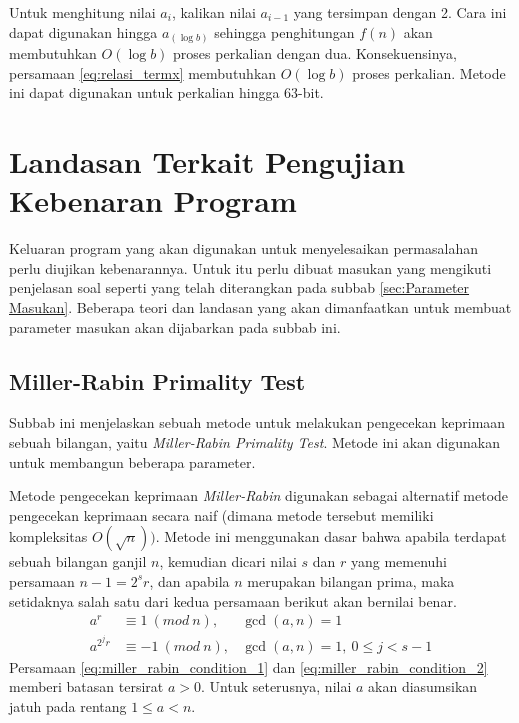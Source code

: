 Untuk menghitung nilai $ a_i $, kalikan nilai $ a_{i-1} $ yang tersimpan dengan 2. Cara ini dapat digunakan hingga $ a_{(\log b)} $ sehingga penghitungan $ f(n) $ akan membutuhkan $ O(\log b) $ proses perkalian dengan dua. Konsekuensinya, persamaan \eqref{eq:relasi_termx} membutuhkan $ O(\allowbreak\log b) $ proses perkalian. Metode ini dapat digunakan untuk perkalian hingga 63-bit.

\section{Landasan Terkait Pengujian Kebenaran Program}
Keluaran program yang akan digunakan untuk menyelesaikan permasalahan perlu diujikan kebenarannya. Untuk itu perlu dibuat masukan yang mengikuti penjelasan soal seperti yang telah diterangkan pada subbab \ref{sec:Parameter Masukan}. Beberapa teori dan landasan yang akan dimanfaatkan untuk membuat parameter masukan akan dijabarkan pada subbab ini.

\subsection{Miller-Rabin Primality Test}

Subbab ini menjelaskan sebuah metode untuk melakukan pengecekan keprimaan sebuah bilangan, yaitu \textit{Miller-Rabin Primality Test}. Metode ini akan digunakan untuk membangun beberapa parameter.

Metode pengecekan keprimaan \textit{Miller-Rabin} digunakan sebagai alternatif metode pengecekan keprimaan secara naif (dimana metode tersebut memiliki kompleksitas $ O(\sqrt{n})) $. Metode ini menggunakan dasar bahwa apabila terdapat sebuah bilangan ganjil $ n $, kemudian dicari nilai $ s $ dan $ r $ yang memenuhi persamaan $ n-1=2^{s} r $, dan apabila $ n $ merupakan bilangan prima, maka setidaknya salah satu dari kedua persamaan berikut akan bernilai benar. \cite{hac_publickey, stallings_cryptography}
\begin{align}
\label{eq:miller_rabin_condition_1}
a^r &\equiv 1\ (mod\ n), & \gcd(a,n)=1 \\
\label{eq:miller_rabin_condition_2}
a^{2^j r} &\equiv -1\ (mod\ n), & \gcd(a,n)=1,\ 0 \leq j <s-1
\end{align}
Persamaan \eqref{eq:miller_rabin_condition_1} dan \eqref{eq:miller_rabin_condition_2} memberi batasan tersirat $ a>0 $. Untuk seterusnya, nilai $ a $ akan diasumsikan jatuh pada rentang $ 1 \leq a < n $.

